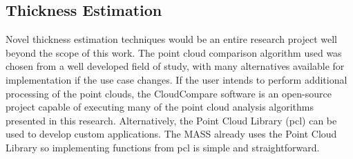 \subsection{Thickness Estimation}

Novel thickness estimation techniques would be an entire research project well beyond the scope of this work. The point cloud comparison algorithm used was chosen from a well developed field of study, with many alternatives available for implementation if the use case changes. If the user intends to perform additional processing of the point clouds, the CloudCompare software is an open-source project capable of executing many of the point cloud analysis algorithms presented in this research. Alternatively, the Point Cloud Library (\acrshort{pcl}) can be used to develop custom applications. The MASS already uses the Point Cloud Library so implementing functions from \acrshort{pcl} is simple and straightforward.\\